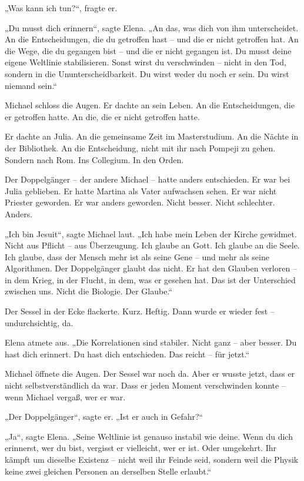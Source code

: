 \documentclass[
]{article}
\begin{document}
„Was kann ich tun?{\kern0pt}``, fragte er.

„Du musst dich erinnern``, sagte Elena. „An das, was dich von ihm unterscheidet. An die Entscheidungen, die du getroffen hast -- und die er nicht getroffen hat. An die Wege, die du gegangen bist -- und die er nicht gegangen ist. Du musst deine eigene Weltlinie stabilisieren. Sonst wirst du verschwinden -- nicht in den Tod, sondern in die Ununterscheidbarkeit. Du wirst weder du noch er sein. Du wirst niemand sein.``

Michael schloss die Augen. Er dachte an sein Leben. An die Entscheidungen, die er getroffen hatte. An die, die er nicht getroffen hatte.

Er dachte an Julia. An die gemeinsame Zeit im Masterstudium. An die Nächte in der Bibliothek. An die Entscheidung, nicht mit ihr nach Pompeji zu gehen. Sondern nach Rom. Ins Collegium. In den Orden.

Der Doppelgänger -- der andere Michael -- hatte anders entschieden. Er war bei Julia geblieben. Er hatte Martina als Vater aufwachsen sehen. Er war nicht Priester geworden. Er war anders geworden. Nicht besser. Nicht schlechter. Anders.

„Ich bin Jesuit``, sagte Michael laut. „Ich habe mein Leben der Kirche gewidmet. Nicht aus Pflicht -- aus Überzeugung. Ich glaube an Gott. Ich glaube an die Seele. Ich glaube, dass der Mensch mehr ist als seine Gene -- und mehr als seine Algorithmen. Der Doppelgänger glaubt das nicht. Er hat den Glauben verloren -- in dem Krieg, in der Flucht, in dem, was er gesehen hat. Das ist der Unterschied zwischen uns. Nicht die Biologie. Der Glaube.``

Der Sessel in der Ecke flackerte. Kurz. Heftig. Dann wurde er wieder fest -- undurchsichtig, da.

Elena atmete aus. „Die Korrelationen sind stabiler. Nicht ganz -- aber besser. Du hast dich erinnert. Du hast dich entschieden. Das reicht -- für jetzt.``

Michael öffnete die Augen. Der Sessel war noch da. Aber er wusste jetzt, dass er nicht selbstverständlich da war. Dass er jeden Moment verschwinden konnte -- wenn Michael vergaß, wer er war.

„Der Doppelgänger``, sagte er. „Ist er auch in Gefahr?{\kern0pt}``

„Ja``, sagte Elena. „Seine Weltlinie ist genauso instabil wie deine. Wenn du dich erinnerst, wer du bist, vergisst er vielleicht, wer er ist. Oder umgekehrt. Ihr kämpft um dieselbe Existenz -- nicht weil ihr Feinde seid, sondern weil die Physik keine zwei gleichen Personen an derselben Stelle erlaubt.``
\end{document}
